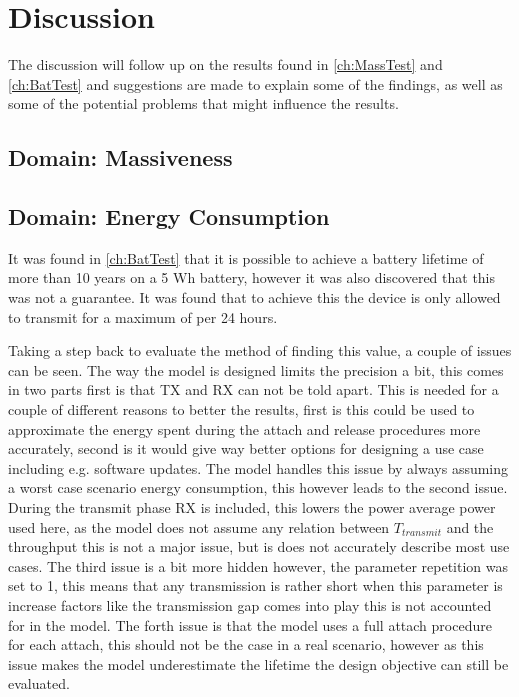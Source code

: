 \chapter{Discussion}
The discussion will follow up on the results found in \autoref{ch:MassTest} and \autoref{ch:BatTest} and suggestions are made to explain some of the findings, as well as some of the potential problems that might influence the results. 

\section{Domain: Massiveness}


\section{Domain: Energy Consumption}
It was found in \autoref{ch:BatTest} that it is possible to achieve a battery lifetime of more than 10 years on a 5 Wh battery, however it was also discovered that this was not a guarantee. It was found that to achieve this the device is only allowed to transmit for a maximum of  per 24 hours. 

Taking a step back to evaluate the method of finding this value, a couple of issues can be seen. The way the model is designed limits the precision a bit, this comes in two parts first is that TX and RX can not be told apart. This is needed for a couple of different reasons to better the results, first is this could be used to approximate the energy spent during the attach and release procedures more accurately, second is it would give way better options for designing a use case including e.g. software updates. The model handles this issue by always assuming a worst case scenario energy consumption, this however leads to the second issue. During the transmit phase RX is included, this lowers the power average power used here, as the model does not assume any relation between $T_{transmit}$ and the throughput this is not a major issue, but is does not accurately describe most use cases. The third issue is a bit more hidden however, the parameter repetition was set to 1, this means that any transmission is rather short when this parameter is increase factors like the transmission gap comes into play this is not accounted for in the model. The forth issue is that the model uses a full attach procedure for each attach, this should not be the case in a real scenario, however as this issue makes the model underestimate the lifetime the design objective can still be evaluated.

